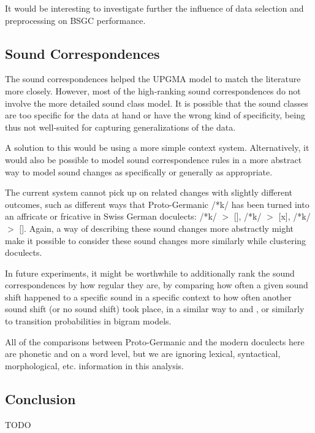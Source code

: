 \documentclass[a4paper]{article}
\begin{document}
It would be interesting to investigate further the influence of
data selection and preprocessing on BSGC performance.

\subsection{Sound Correspondences}

The sound correspondences helped the UPGMA model
to match the literature more closely.
However, most of the high-ranking sound correspondences
do not involve the more detailed sound class model.
It is possible that the sound classes are too specific
for the data at hand or have the wrong kind of specificity,
being thus not well-suited for capturing generalizations of the data.

A solution to this would be using a more simple context system.
Alternatively, it would also be possible to model sound correspondence
rules in a more abstract way to model sound changes
as specifically or generally as appropriate.


The current system cannot pick up on related changes
with slightly different outcomes, such as different
ways that Proto-Germanic /*k/ has been turned into
an affricate or fricative in Swiss German doculects:
/*k/ $>$ [], /*k/ $>$ [x], /*k/ $>$ [\textchi].
Again, a way of describing these sound changes more abstractly
might make it possible to consider these sound changes more
similarly while clustering doculects.

In future experiments, it might be worthwhile to additionally rank
the sound correspondences by how regular they are,
by comparing how often a given sound shift happened
to a specific sound in a specific context
to how often another sound shift (or no sound shift) took place,
in a similar way to \citet{prokic2007identifying} and \citet{prokic2013combining},
or similarly to transition probabilities in bigram models.

All of the comparisons between Proto-Germanic and the modern doculects
here are phonetic
and on a word level, but we are ignoring
lexical, syntactical, morphological, etc. information in this analysis.

\subsection{Conclusion} %

TODO



\end{document}
